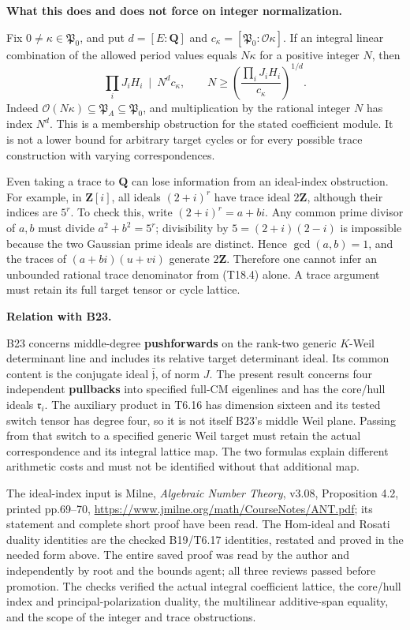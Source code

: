 \textbf{What this does and does not force on integer normalization.}

Fix \(0\ne\kappa\in\mathfrak P_0\), and put \(d=[E:\mathbf Q]\) and \(c_\kappa=[\mathfrak P_0:\mathcal O\kappa]\). If an integral linear combination of the allowed period values equals \(N\kappa\) for a positive integer \(N\), then \[
\prod_iJ_iH_i\ \mid\ N^d c_\kappa,
\qquad
N\ge\left(\frac{\prod_iJ_iH_i}{c_\kappa}\right)^{1/d}.
\tag{T18.8}
\] Indeed \(\mathcal O(N\kappa)\subseteq\mathfrak P_A\subseteq\mathfrak P_0\), and multiplication by the rational integer \(N\) has index \(N^d\). This is a membership obstruction for the stated coefficient module. It is not a lower bound for arbitrary target cycles or for every possible trace construction with varying correspondences.

Even taking a trace to \(\mathbf Q\) can lose information from an ideal-index obstruction. For example, in \(\mathbf Z[i]\), all ideals \((2+i)^r\) have trace ideal \(2\mathbf Z\), although their indices are \(5^r\). To check this, write \((2+i)^r=a+bi\). Any common prime divisor of \(a,b\) must divide \(a^2+b^2=5^r\); divisibility by \(5=(2+i)(2-i)\) is impossible because the two Gaussian prime ideals are distinct. Hence \(\gcd(a,b)=1\), and the traces of \((a+bi)(u+vi)\) generate \(2\mathbf Z\). Therefore one cannot infer an unbounded rational trace denominator from (T18.4) alone. A trace argument must retain its full target tensor or cycle lattice.

\textbf{Relation with B23.}

B23 concerns middle-degree \textbf{pushforwards} on the rank-two generic \(K\)-Weil determinant line and includes its relative target determinant ideal. Its common content is the conjugate ideal \(\bar{\mathfrak j}\), of norm \(J\). The present result concerns four independent \textbf{pullbacks} into specified full-CM eigenlines and has the core/hull ideals \(\mathfrak r_i\). The auxiliary product in T6.16 has dimension sixteen and its tested switch tensor has degree four, so it is not itself B23's middle Weil plane. Passing from that switch to a specified generic Weil target must retain the actual correspondence and its integral lattice map. The two formulas explain different arithmetic costs and must not be identified without that additional map.

The ideal-index input is Milne, \emph{Algebraic Number Theory}, v3.08, Proposition 4.2, printed pp.69--70, \url{https://www.jmilne.org/math/CourseNotes/ANT.pdf}; its statement and complete short proof have been read. The Hom-ideal and Rosati duality identities are the checked B19/T6.17 identities, restated and proved in the needed form above. The entire saved proof was read by the author and independently by root and the bounds agent; all three reviews passed before promotion. The checks verified the actual integral coefficient lattice, the core/hull index and principal-polarization duality, the multilinear additive-span equality, and the scope of the integer and trace obstructions.

